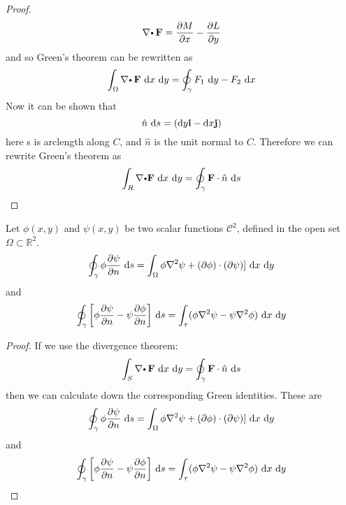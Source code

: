 \begin{proof}
 

\[
  \nabla \bp\,\vector{F} = \frac{\partial M}{\partial x} - \frac{\partial L}{\partial y}
\]
and so Green's theorem can be rewritten as 
\[
  \int_\Omega\nabla \bp\,\vector{F}\,\d x\,\d y = \oint_\caminho F_1\,\d y - F_2\,\d x
\]
Now it can be shown that
\[
  \hat {n}\,\d s = (\d y \vector{i} -\d x \vector{j})
\]
here s is arclength along $C$, and $\hat {n}$ is the unit normal to $C$. Therefore we can rewrite
Green’s theorem as
\[
  \int_R\nabla \bp\vector{F}\,\d x\,\d y = \oint_\caminho\vector{F}\cdot \hat {n}\,\d s
\]


\end{proof}



\begin{theorem}
 Let $\phi(x,y)$ and $\psi(x,y)$ be two scalar functions  $\mathcal{C}^{2}$, defined in the open set $\Omega \subset \mathbb{R}^{2}$.
\[
  \oint_\caminho \phi \frac{\partial \psi}{\partial n}\,\d s
  = \int_\Omega \phi \nabla^2 \psi +  (\partial \phi)\cdot(\partial \psi)]\,\d x\,\d y
\]
and 
\[
  \oint_\caminho  \left[\phi\frac{\partial \psi}{\partial n}- \psi\frac{\partial \phi}{\partial n}\right]
  \,\d s
  = \int_\tau 
  (\phi \nabla^2\psi - \psi \nabla^2\phi)\,\d x\,\d y
\]
\end{theorem}


\begin{proof}
If we use the divergence theorem:
\[
  \int_S \nabla \bp\,\vector{F}\,\d x\,\d y
  = \oint_\caminho\vector{F}\cdot \hat  n \,\d s
\]
then we can calculate down the corresponding Green identities. These are 
\[
  \oint_\caminho \phi \frac{\partial \psi}{\partial n}\,\d s
  = \int_\Omega \phi \nabla^2 \psi +  (\partial \phi)\cdot(\partial \psi)]\,\d x\,\d y
\]
and 
\[
  \oint_\caminho  \left[\phi\frac{\partial \psi}{\partial n}- \psi\frac{\partial \phi}{\partial n}\right]
  \,\d s
  = \int_\tau 
  (\phi \nabla^2\psi - \psi \nabla^2\phi)\,\d x\,\d y
\]

\end{proof}
